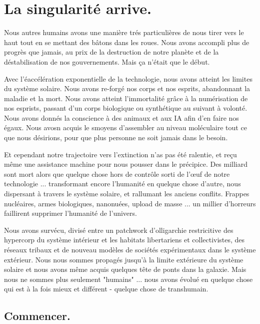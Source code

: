 \chapter{La singularité arrive.} \label{chap:enter-the-singularity} 

Nous autres humains avons une manière trés particulières de nous tirer vers le haut tout en se mettant des bâtons dans les roues. Nous avons accompli plus de progrès que jamais, au prix de la destruction de notre planète et de la déstabilisation de nos gouvernements. Mais ça n'était que le début. 

Avec l'éaccélération exponentielle de la technologie, nous avons atteint les limites du système solaire. Nous avons re-forgé nos corps et nos esprits, abandonnant la maladie et la mort. Nous avons atteint l'immortalité grâce à la numérisation de nos esprists, passant d'un corps biologique ou synthétique au suivant à volonté. Nous avons donnés la conscience à des animaux et aux IA afin d'en faire nos égaux. Nous avosn acquis le smoyens d'assembler au niveau moléculaire tout ce que nous désirions, pour que plus personne ne soit jamais dans le besoin. 

Et cependant notre trajectoire vers l'extinction n'as pas été ralentie, et reçu même une assistance machine pour nous pousser dans le précipice. Des milliard sont mort alors que quelque chose hors de contrôle sorti de l'œuf de notre technologie ... transformant encore l'humanité en quelque chose d'autre, nous dispersant à travers le système solaire, et rallumant les anciens conflits. Frappes nucléaires, armes biologiques, nanonuées, upload de masse ... un millier d'horreurs faillirent supprimer l'humanité de l'univers. 

Nous avons survécu, divisé entre un patchwork d'olligarchie restricitive des hypercorp du système intérieur et les habitats libertariens et collectivistes, des réseaux tribaux et de nouveau modèles de sociétés expérimentaux dans le système extérieur. Nous nous sommes propagés jusqu'à la limite extérieure du système solaire et nous avons même acquis quelques tête de ponts dans la galaxie. Mais nous ne sommes plus seulement "humains" ... nous avons évolué en quelque chose qui est à la fois mieux et différent - quelque chose de transhumain. 



\section{Commencer.} \label{sec:starting-out} 

